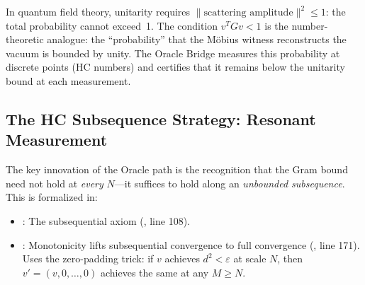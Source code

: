 \begin{correspondence}
\label{corr:ceiling}
In quantum field theory, unitarity requires $\|\text{scattering amplitude}\|^2 \leq 1$:
the total probability cannot exceed~1. The condition $v^T G v < 1$ is the
number-theoretic analogue: the ``probability'' that the Möbius witness
reconstructs the vacuum is bounded by unity. The Oracle Bridge measures
this probability at discrete points (HC numbers) and certifies that
it remains below the unitarity bound at each measurement.
\end{correspondence}

\subsection{The HC Subsequence Strategy: Resonant Measurement}

The key innovation of the Oracle path is the recognition that the Gram
bound need not hold at \emph{every} $N$---it suffices to hold along
an \emph{unbounded subsequence}. This is formalized in:

\begin{itemize}
  \item {}: The subsequential axiom
    (, line 108).
  \item {}: Monotonicity lifts subsequential
    convergence to full convergence (, line 171).
    Uses the zero-padding trick: if $v$ achieves $d^2 < \varepsilon$
    at scale $N$, then $v' = (v, 0, \ldots, 0)$ achieves the same at
    any $M \geq N$.
\end{itemize}

